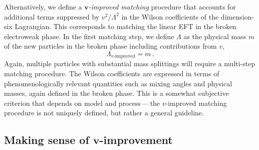 Alternatively, we define a \emph{$\boldsymbol{v}$-improved matching} procedure that
accounts for additional terms suppressed by $v^2 / \Lambda^2$ in the
Wilson coefficients of the dimension-six Lagrangian. This corresponds
to matching the linear EFT in the broken electroweak phase. In the
first matching step, we define $\Lambda$ as the physical mass $m$ of
the new particles in the broken phase including contributions from
$v$,
%
\begin{equation}
  \Lambda_{\text{$v$-improved}} = m \,.
\end{equation}
%
Again, multiple particles with substantial mass splittings will
require a multi-step matching procedure. The Wilson coefficients are
expressed in terms of phenomenologically relevant quantities such as
mixing angles and physical masses, again defined in the broken
phase. This is a somewhat subjective criterion that depends on model
and process\,---\,the $v$-improved matching procedure is not uniquely
defined, but rather a general guideline.



\subsection[Making sense of $v$-improvement]{Making sense of $\boldsymbol{v}$-improvement}

